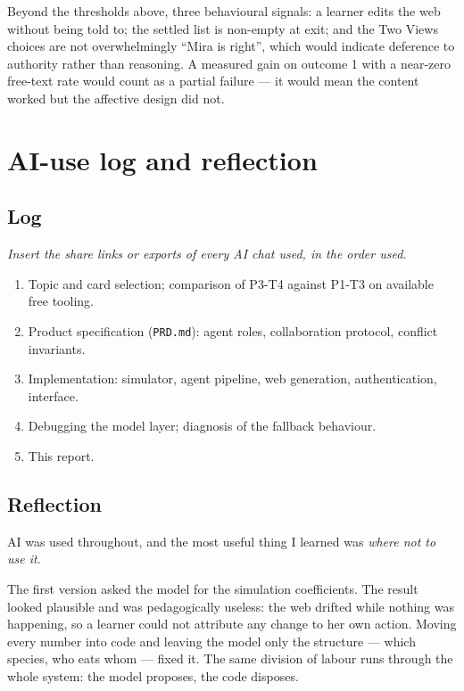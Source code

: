 \documentclass[11pt,a4paper]{article}
\begin{document}
Beyond the thresholds above, three behavioural signals: a learner edits the web without being
told to; the settled list is non-empty at exit; and the Two Views choices are not overwhelmingly
``Mira is right'', which would indicate deference to authority rather than reasoning. A measured
gain on outcome 1 with a near-zero free-text rate would count as a partial failure --- it would
mean the content worked but the affective design did not.

\section*{AI-use log and reflection}

\subsection*{Log}

\textit{Insert the share links or exports of every AI chat used, in the order used.}

\begin{enumerate}[leftmargin=*,itemsep=1pt]
  \item Topic and card selection; comparison of P3-T4 against P1-T3 on available free tooling.
  \item Product specification (\texttt{PRD.md}): agent roles, collaboration protocol, conflict
        invariants.
  \item Implementation: simulator, agent pipeline, web generation, authentication, interface.
  \item Debugging the model layer; diagnosis of the fallback behaviour.
  \item This report.
\end{enumerate}

\subsection*{Reflection}

AI was used throughout, and the most useful thing I learned was \emph{where not to use it}.

The first version asked the model for the simulation coefficients. The result looked plausible
and was pedagogically useless: the web drifted while nothing was happening, so a learner could
not attribute any change to her own action. Moving every number into code and leaving the model
only the structure --- which species, who eats whom --- fixed it. The same division of labour
runs through the whole system: the model proposes, the code disposes.
\end{document}
